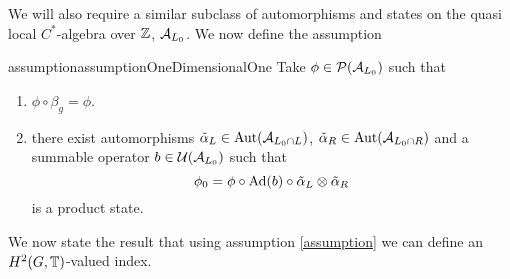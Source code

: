 \documentclass[11pt,a4paper,twoside]{article}
\numberwithin{equation}{section}
\begin{document}
We will also require a similar subclass of automorphisms and states on the quasi local $C^*$-algebra over $\ZZ$, $\AA_{L_0}$. We now define the assumption
\begin{restatable}{assumption}{assumptionOneDimensionalOne}\label{assumption1d}
	Take $\phi\in\PP(\AA_{L_0})$ such that
	\begin{enumerate}
		\item $\phi\circ\beta_g=\phi$.
		\item there exist automorphisms $\tilde\alpha_L\in\Aut{\AA_{L_0\cap L}}$, $\tilde\alpha_R\in\Aut{\AA_{L_0\cap R}}$ and a summable operator $b\in\UU(\AA_{L_0})$ such that
		\begin{equation}
			\phi_0=\phi\circ\Ad{b}\circ\tilde\alpha_{L}\otimes\tilde\alpha_{R}
		\end{equation}
		is a product state.
	\end{enumerate}
\end{restatable}
We now state the result that using assumption \ref{assumption} we can define an $H^2(G,\TT)$-valued index.
\end{document}
